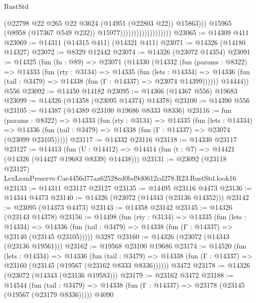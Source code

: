 \begin{lexlean}{RustStd}
\begin{coremodule}
                                              (@22798
                                                @22
                                                @265
                                                @22
                                                @3624
                                                (@14951 (@22803 @22))
                                                @15863)))
                                          @15965
                                          (@8958 (@17367 @549 @232))
                                          @15977)))))))))))))))))))
@23065 := @14309 @411
@23069 := @14311 (@14315 @411) (@14321 @411)
@23071 := @14326 (@14180 @14327)
@23072 := @8329 @12442
@23074 := @14326 (@23072 @14354)
@23091 := @14325
    (fun (fn : @89) =>
    @23071
      (@14330
        (@14332
          (fun (params : @8322) =>
          @14333
            (fun (rty : @3134) =>
            @14335
              (fun (lets : @14334) =>
              @14336 (fun (tail : @3479) => @14338 (fun (Γ : @14337) => @23074 @14399))))))
        @14444))
    @556
@23092 := @14450 @14182
@23095 := @14366 (@14367 @556) @19683
@23099 := @14326 (@14358 (@23095 @14374) @14378)
@23100 := @14390 @556
@23105 := @14387 (@14389 @23100 @19686 @8333 @8336)
@23116 := fun (params : @8322) =>
  @14333
    (fun (rty : @3134) =>
    @14335
      (fun (lets : @14334) =>
      @14336 (fun (tail : @3479) => @14338 (fun (Γ : @14337) => @23074 (@23099 @23105)))))
@23117 := @14332 @23116
@23118 := @14330 @23117
@23127 := @14413
    (fun (U : @14412) => @14414 (fun (t : @7) => @14421 (@14326 (@14427 @19683 @8339) @14438)))
@23131 := @23092
    (@23118 @23127)
    LexLeanPreserve.Cae4456d77aa62528ed0bd9d0612cd278.R23.RustStd.look16
@23133 := @14311 @23117 @23127
@23135 := @14495 @23116 @4473
@23136 := @14344 @4473
@23140 := @14326 (@23072 (@14343 (@23136 @14352)))
@23142 := @23095 (@14373 @4473)
@23143 := @14358 @23142
@23145 := @14326 (@23143 @14378)
@23156 := @14498
    (fun (rty : @3134) =>
    @14335
      (fun (lets : @14334) =>
      @14336 (fun (tail : @3479) => @14338 (fun (Γ : @14337) => @23140 (@23145 @23105)))))
    @3287
@23160 := @14326 (@23072 (@14343 (@23136 @19561)))
@23162 := @19568 @23100 @19686
@23174 := @14520
    (fun (lets : @14334) =>
    @14336
      (fun (tail : @3479) =>
      @14338 (fun (Γ : @14337) => @23160 (@23145 (@19567 (@23162 @8333 @8336))))))
    @3472
@23178 := @14326 (@23072 (@14343 (@23136 @19583)))
@23179 := @23162 @3472
@23188 := @14544
    (fun (tail : @3479) => @14338 (fun (Γ : @14337) => @23178 (@23145 (@19567 (@23179 @8336)))))
    @4090

\end{coremodule}
\end{lexlean}
